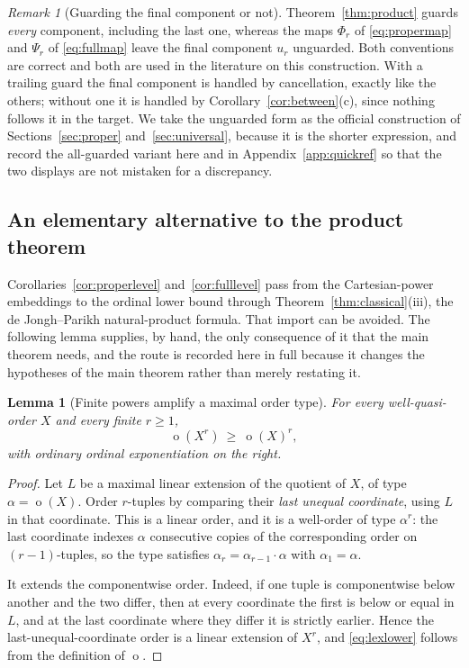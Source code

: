 \documentclass[11pt,a4paper]{article}
\numberwithin{equation}{section}
\newtheorem{lemma}[theorem]{Lemma}
\theoremstyle{definition}
\theoremstyle{remark}
\newtheorem{remark}[theorem]{Remark}
\newcommand{\mot}{\mathop{o}}
\begin{document}
\begin{remark}[Guarding the final component or not]\label{rem:lastguard}
Theorem~\ref{thm:product} guards \emph{every} component, including the last
one, whereas the maps $\Phi_r$ of \eqref{eq:propermap} and $\Psi_r$ of
\eqref{eq:fullmap} leave the final component $u_r$ unguarded. Both conventions
are correct and both are used in the literature on this construction. With a
trailing guard the final component is handled by cancellation, exactly like
the others; without one it is handled by Corollary~\ref{cor:between}(c),
since nothing follows it in the target. We take the unguarded form as the
official construction of Sections~\ref{sec:proper} and~\ref{sec:universal},
because it is the shorter expression, and record the all-guarded variant here
and in Appendix~\ref{app:quickref} so that the two displays are not mistaken
for a discrepancy.
\end{remark}

\subsection{An elementary alternative to the product theorem}
\label{sec:altroute}

Corollaries~\ref{cor:properlevel} and~\ref{cor:fulllevel} pass from the
Cartesian-power embeddings to the ordinal lower bound through
Theorem~\ref{thm:classical}(iii), the de Jongh--Parikh natural-product
formula. That import can be avoided. The following lemma supplies, by hand,
the only consequence of it that the main theorem needs, and the route is
recorded here in full because it changes the hypotheses of the main theorem
rather than merely restating it.

\begin{lemma}[Finite powers amplify a maximal order type]\label{lem:power}
For every well-quasi-order $X$ and every finite $r\ge1$,
\begin{equation}\label{eq:lexlower}
 \mot(X^r)\ \ge\ \mot(X)^r,
\end{equation}
with \emph{ordinary} ordinal exponentiation on the right.
\end{lemma}
\begin{proof}
Let $L$ be a maximal linear extension of the quotient of $X$, of type
$\alpha=\mot(X)$. Order $r$-tuples by comparing their \emph{last unequal
coordinate}, using $L$ in that coordinate. This is a linear order, and it is a
well-order of type $\alpha^r$: the last coordinate indexes $\alpha$
consecutive copies of the corresponding order on $(r-1)$-tuples, so the type
satisfies $\alpha_r=\alpha_{r-1}\cdot\alpha$ with $\alpha_1=\alpha$.

It extends the componentwise order. Indeed, if one tuple is componentwise
below another and the two differ, then at every coordinate the first is below
or equal in $L$, and at the last coordinate where they differ it is strictly
earlier. Hence the last-unequal-coordinate order is a linear extension of
$X^r$, and \eqref{eq:lexlower} follows from the definition of $\mot$.
\end{proof}
\end{document}

